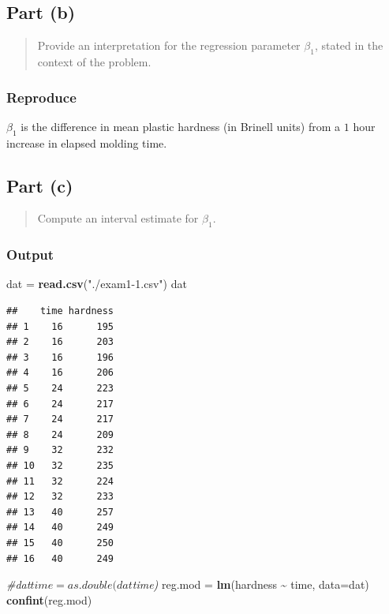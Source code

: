 \documentclass[
]{article}
\newenvironment{Shaded}{\begin{snugshade}}{\end{snugshade}}
\newcommand{\AttributeTok}[1]{\textcolor[rgb]{0.13,0.29,0.53}{#1}}
\newcommand{\CommentTok}[1]{\textcolor[rgb]{0.56,0.35,0.01}{\textit{#1}}}
\newcommand{\FunctionTok}[1]{\textcolor[rgb]{0.13,0.29,0.53}{\textbf{#1}}}
\newcommand{\NormalTok}[1]{#1}
\newcommand{\OtherTok}[1]{\textcolor[rgb]{0.56,0.35,0.01}{#1}}
\newcommand{\SpecialCharTok}[1]{\textcolor[rgb]{0.81,0.36,0.00}{\textbf{#1}}}
\newcommand{\StringTok}[1]{\textcolor[rgb]{0.31,0.60,0.02}{#1}}
\begin{document}
\hypertarget{part-b}{%
\subsection{Part (b)}\label{part-b}}

\begin{quote}
Provide an interpretation for the regression parameter \(\beta_1\),
stated in the context of the problem.
\end{quote}

\hypertarget{reproduce-1}{%
\subsubsection{Reproduce}\label{reproduce-1}}

\(\beta_1\) is the difference in mean plastic hardness (in Brinell
units) from a \(1\) hour increase in elapsed molding time.

\hypertarget{part-c}{%
\subsection{Part (c)}\label{part-c}}

\begin{quote}
Compute an interval estimate for \(\beta_1\).
\end{quote}

\hypertarget{output}{%
\subsubsection{Output}\label{output}}

\begin{Shaded}
\begin{Highlighting}[]
\NormalTok{dat }\OtherTok{=} \FunctionTok{read.csv}\NormalTok{(}\StringTok{"./exam1{-}1.csv"}\NormalTok{)}
\NormalTok{dat}
\end{Highlighting}
\end{Shaded}

\begin{verbatim}
##    time hardness
## 1    16      195
## 2    16      203
## 3    16      196
## 4    16      206
## 5    24      223
## 6    24      217
## 7    24      217
## 8    24      209
## 9    32      232
## 10   32      235
## 11   32      224
## 12   32      233
## 13   40      257
## 14   40      249
## 15   40      250
## 16   40      249
\end{verbatim}

\begin{Shaded}
\begin{Highlighting}[]
\CommentTok{\#dat$time = as.double(dat$time)}
\NormalTok{reg.mod }\OtherTok{=} \FunctionTok{lm}\NormalTok{(hardness }\SpecialCharTok{\textasciitilde{}}\NormalTok{ time, }\AttributeTok{data=}\NormalTok{dat)}
\FunctionTok{confint}\NormalTok{(reg.mod)}
\end{Highlighting}
\end{Shaded}
\end{document}
